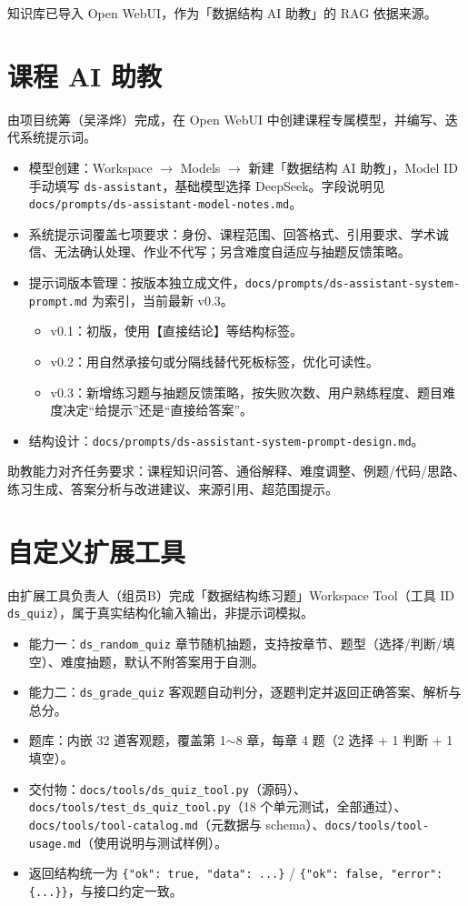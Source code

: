 \documentclass[12pt,a4paper]{ctexart}
\begin{document}
知识库已导入 Open WebUI，作为「数据结构 AI 助教」的 RAG 依据来源。

\section{课程 AI 助教}

由项目统筹（吴泽烨）完成，在 Open WebUI 中创建课程专属模型，并编写、迭代系统提示词。

\begin{itemize}
  \item 模型创建：Workspace $\rightarrow$ Models $\rightarrow$ 新建「数据结构 AI 助教」，Model ID 手动填写 \texttt{ds-assistant}，基础模型选择 DeepSeek。字段说明见 \texttt{docs/prompts/ds-assistant-model-notes.md}。
  \item 系统提示词覆盖七项要求：身份、课程范围、回答格式、引用要求、学术诚信、无法确认处理、作业不代写；另含难度自适应与抽题反馈策略。
  \item 提示词版本管理：按版本独立成文件，\texttt{docs/prompts/ds-assistant-system-prompt.md} 为索引，当前最新 v0.3。
  \begin{itemize}
    \item v0.1：初版，使用【直接结论】等结构标签。
    \item v0.2：用自然承接句或分隔线替代死板标签，优化可读性。
    \item v0.3：新增练习题与抽题反馈策略，按失败次数、用户熟练程度、题目难度决定“给提示”还是“直接给答案”。
  \end{itemize}
  \item 结构设计：\texttt{docs/prompts/ds-assistant-system-prompt-design.md}。
\end{itemize}

助教能力对齐任务要求：课程知识问答、通俗解释、难度调整、例题/代码/思路、练习生成、答案分析与改进建议、来源引用、超范围提示。

\section{自定义扩展工具}

由扩展工具负责人（组员B）完成「数据结构练习题」Workspace Tool（工具 ID \texttt{ds\_quiz}），属于真实结构化输入输出，非提示词模拟。

\begin{itemize}
  \item 能力一：\texttt{ds\_random\_quiz} 章节随机抽题，支持按章节、题型（选择/判断/填空）、难度抽题，默认不附答案用于自测。
  \item 能力二：\texttt{ds\_grade\_quiz} 客观题自动判分，逐题判定并返回正确答案、解析与总分。
  \item 题库：内嵌 32 道客观题，覆盖第 1$\sim$8 章，每章 4 题（2 选择 + 1 判断 + 1 填空）。
  \item 交付物：\texttt{docs/tools/ds\_quiz\_tool.py}（源码）、\texttt{docs/tools/test\_ds\_quiz\_tool.py}（18 个单元测试，全部通过）、\texttt{docs/tools/tool-catalog.md}（元数据与 schema）、\texttt{docs/tools/tool-usage.md}（使用说明与测试样例）。
  \item 返回结构统一为 \texttt{\{"ok": true, "data": ...\}} / \texttt{\{"ok": false, "error": \{...\}\}}，与接口约定一致。
\end{itemize}
\end{document}
